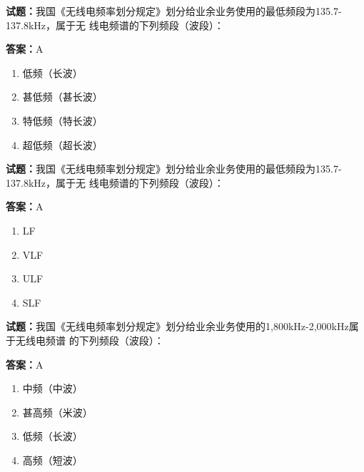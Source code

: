 \documentclass{ctexbook}
\begin{document}




\vspace{1em}

\textbf{试题：}我国《无线电频率划分规定》划分给业余业务使用的最低频段为135.7-137.8kHz，属于无
线电频谱的下列频段（波段）： 

\textbf{答案：}A 

\begin{enumerate}[leftmargin=3em]
  \item 低频（长波） 

  \item 甚低频（甚长波） 

  \item 特低频（特长波） 

  \item 超低频（超长波） 

\end{enumerate}





\vspace{1em}

\textbf{试题：}我国《无线电频率划分规定》划分给业余业务使用的最低频段为135.7-137.8kHz，属于无
线电频谱的下列频段（波段）： 


\textbf{答案：}A 

\begin{enumerate}[leftmargin=3em]
  \item LF 

  \item VLF 

  \item ULF 

  \item SLF 

\end{enumerate}





\vspace{1em}

\textbf{试题：}我国《无线电频率划分规定》划分给业余业务使用的1,800kHz-2,000kHz属于无线电频谱
的下列频段（波段）： 

\textbf{答案：}A 

\begin{enumerate}[leftmargin=3em]
  \item 中频（中波） 

  \item 甚高频（米波） 

  \item 低频（长波） 

  \item 高频（短波） 

\end{enumerate}
\end{document}
